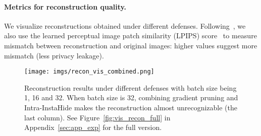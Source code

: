 \paragraph{Metrics for reconstruction quality.} We visualize reconstructions obtained under different defenses. Following~\citep{yin2021see}, we also use the learned perceptual image patch similarity (LPIPS) score~\citep{zhang2018unreasonable} to measure mismatch between reconstruction and original images: higher values suggest more mismatch (less privacy leakage).




\begin{figure}[ht]
  \centering
  \texttt{[image: imgs/recon\_vis\_combined.png]}
  \caption{Reconstruction results under different defenses with batch size being 1, 16 and 32. When batch size is 32, combining gradient pruning and Intra-InstaHide makes the reconstruction almost unrecognizable (the last column). See Figure~\ref{fig:vis_recon_full} in Appendix~\ref{sec:app_exp} for the full version.}
  \label{fig:vis_recon}
\end{figure}

